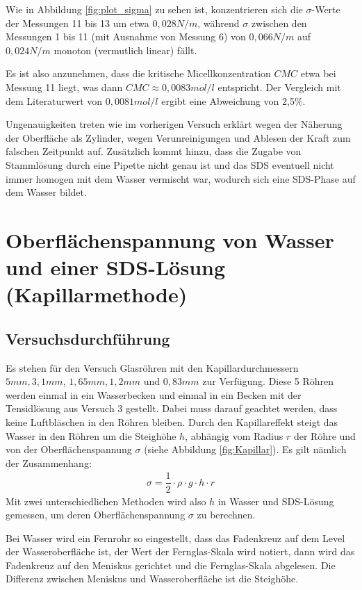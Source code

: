 \documentclass{scrartcl}
\begin{document}
Wie in Abbildung \ref{fig:plot_sigma} zu sehen ist, konzentrieren sich die $\sigma$-Werte der Messungen 11 bis 13 um etwa $0,028N/m$, während $\sigma$ zwischen den Messungen 1 bis 11 (mit Ausnahme von Messung 6) von $0,066N/m$ auf $0,024N/m$ monoton (vermutlich linear) fällt.

Es ist also anzunehmen, dass die kritische Micellkonzentration $CMC$ etwa bei Messung 11 liegt, was dann $CMC \approx 0,0083 mol/l$ entspricht. Der Vergleich mit dem Literaturwert von $0,0081 mol/l$ ergibt eine Abweichung von 2,5\%.

Ungenauigkeiten treten wie im vorherigen Versuch erklärt wegen der Näherung der Oberfläche als Zylinder, wegen Verunreinigungen und Ablesen der Kraft zum falschen Zeitpunkt auf.
Zusätzlich kommt hinzu, dass die Zugabe von Stammlösung durch eine Pipette nicht genau ist und das SDS eventuell nicht immer homogen mit dem Wasser vermischt war, wodurch sich eine SDS-Phase auf dem Wasser bildet.
\newpage 
\section{Oberflächenspannung von Wasser und einer SDS-Lösung (Kapillarmethode)}
\subsection{Versuchsdurchführung}
Es stehen für den Versuch Glasröhren mit den Kapillardurchmessern $5mm, 3,1mm$, $1,65mm, 1,2mm$ und $0,83mm$ zur Verfügung. Diese 5 Röhren werden einmal in ein Wasserbecken und einmal in ein Becken mit der Tensidlösung aus Versuch 3 gestellt. Dabei muss darauf geachtet werden, dass keine Luftbläschen in den Röhren bleiben. Durch den Kapillareffekt steigt das Wasser in den Röhren um die Steighöhe $h$, abhängig vom Radius $r$ der Röhre und von der Oberflächenspannung $\sigma$ (siehe Abbildung \ref{fig:Kapillar}). Es gilt nämlich der Zusammenhang:
\begin{align}
\sigma = \dfrac{1}{2}\cdot \rho \cdot g \cdot h \cdot r
\end{align}
Mit zwei unterschiedlichen Methoden wird also $h$ in Wasser und SDS-Lösung gemessen, um deren Oberflächenspannung $\sigma$ zu berechnen.

Bei Wasser wird ein Fernrohr so eingestellt, dass das Fadenkreuz auf dem Level der Wasseroberfläche ist, der Wert der Fernglas-Skala wird notiert, dann wird das Fadenkreuz auf den Meniskus gerichtet und die Fernglas-Skala abgelesen. Die Differenz zwischen Meniskus und Wasseroberfläche ist die Steighöhe.
\end{document}
